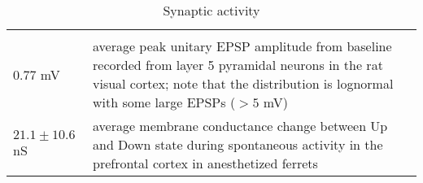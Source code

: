 \documentclass[a4paper, 10pt]{article}
\begin{document}
\begin{table}[h]
\captionsetup{font=small}
\footnotesize
\centering
\begin{tabular}[c]{p{3cm}p{6cm}}
\hline \\
0.77 mV   & average peak unitary EPSP amplitude from baseline recorded from layer 5 pyramidal neurons in the rat visual cortex; note that the distribution is lognormal  with some large EPSPs ($> 5$ mV)  \cite{song2005highly} \\
$21.1 \pm 10.6$ nS & average membrane conductance change between Up and Down state during spontaneous activity in the prefrontal cortex in anesthetized ferrets \cite{haider2006neocortical} \\
\hline
\end{tabular}
\caption{Synaptic activity}
\end{table}



\end{document}
